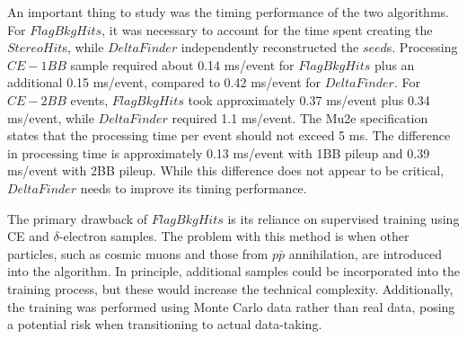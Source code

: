 An important thing to study was the timing performance of the 
two algorithms. For $FlagBkgHits$, it was necessary to account for the time 
spent creating the $StereoHit$s, while $DeltaFinder$ independently 
reconstructed the $seed$s. Processing $CE-1BB$ sample required about 
0.14 ms/event for $FlagBkgHits$ plus an additional 0.15 ms/event, 
compared to 0.42 ms/event for $DeltaFinder$. For $CE-2BB$ events, 
$FlagBkgHits$ took approximately 0.37 ms/event plus 0.34 ms/event, 
while $DeltaFinder$ required 1.1 ms/event. The Mu2e specification states 
that the processing time per event should not exceed 5 ms. The 
difference in processing time is approximately 0.13 ms/event with 
1BB pileup and 0.39 ms/event with 2BB pileup. While this difference 
does not appear to be critical, $DeltaFinder$ needs to improve its timing performance.

The primary drawback of $FlagBkgHits$ is its reliance 
on supervised training using CE and $\delta$-electron samples. 
The problem with this method is when other particles, such as cosmic muons 
and those from $p\bar{p}$ annihilation, are introduced into the algorithm. 
In principle, additional samples could be incorporated into the training 
process, but these would increase the technical complexity. 
Additionally, the training was performed using Monte Carlo data 
rather than real data, posing a potential risk when transitioning 
to actual data-taking. 

